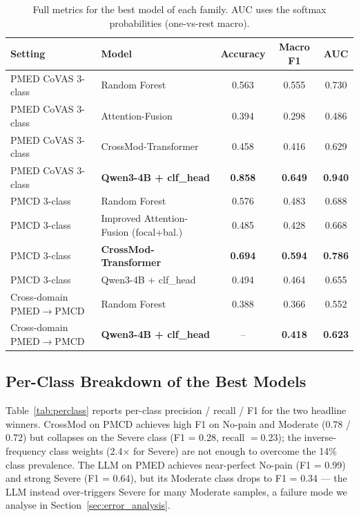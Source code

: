\documentclass{article}
\begin{document}
\begin{table}[t]
\centering
\caption{Full metrics for the best model of each family. AUC uses the softmax probabilities (one-vs-rest macro).}
\label{tab:full_metrics}
\small
\begin{tabular}{@{}llccc@{}}
\toprule
\textbf{Setting} & \textbf{Model} & \textbf{Accuracy} & \textbf{Macro F1} & \textbf{AUC} \\
\midrule
PMED CoVAS 3-class & Random Forest & 0.563 & 0.555 & 0.730 \\
PMED CoVAS 3-class & Attention-Fusion & 0.394 & 0.298 & 0.486 \\
PMED CoVAS 3-class & CrossMod-Transformer & 0.458 & 0.416 & 0.629 \\
PMED CoVAS 3-class & \textbf{Qwen3-4B + clf\_head} & \textbf{0.858} & \textbf{0.649} & \textbf{0.940} \\
\midrule
PMCD 3-class & Random Forest & 0.576 & 0.483 & 0.688 \\
PMCD 3-class & Improved Attention-Fusion (focal+bal.) & 0.485 & 0.428 & 0.668 \\
PMCD 3-class & \textbf{CrossMod-Transformer} & \textbf{0.694} & \textbf{0.594} & \textbf{0.786} \\
PMCD 3-class & Qwen3-4B + clf\_head & 0.494 & 0.464 & 0.655 \\
\midrule
Cross-domain PMED$\to$PMCD & Random Forest & 0.388 & 0.366 & 0.552 \\
Cross-domain PMED$\to$PMCD & \textbf{Qwen3-4B + clf\_head} & -- & \textbf{0.418} & \textbf{0.623} \\
\bottomrule
\end{tabular}
\end{table}

\subsection{Per-Class Breakdown of the Best Models}

Table~\ref{tab:perclass} reports per-class precision / recall / F1 for the two headline winners. CrossMod on PMCD achieves high F1 on No-pain and Moderate (0.78 / 0.72) but collapses on the Severe class (F1 = 0.28, recall $= 0.23$); the inverse-frequency class weights (2.4$\times$ for Severe) are not enough to overcome the 14\% class prevalence. The LLM on PMED achieves near-perfect No-pain (F1 = 0.99) and strong Severe (F1 = 0.64), but its Moderate class drops to F1 = 0.34 --- the LLM instead over-triggers Severe for many Moderate samples, a failure mode we analyse in Section~\ref{sec:error_analysis}.
\end{document}
